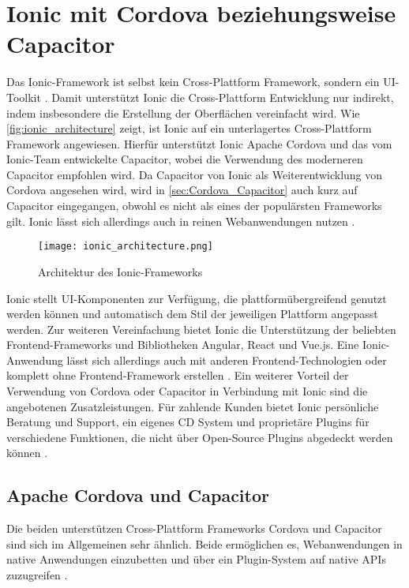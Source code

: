 \section{Ionic mit Cordova beziehungsweise Capacitor}
\label{sec:Frameworks_Ionic}

Das Ionic-Framework ist selbst kein Cross-Plattform Framework, sondern ein UI-Toolkit  \cite{Ionic_Docs}.
Damit unterstützt Ionic die Cross-Plattform Entwicklung nur indirekt, indem insbesondere die Erstellung der Oberflächen vereinfacht wird.
Wie \autoref{fig:ionic_architecture} zeigt, ist Ionic auf ein unterlagertes Cross-Plattform Framework angewiesen.
Hierfür unterstützt Ionic Apache Cordova und das vom Ionic-Team entwickelte Capacitor, wobei die Verwendung des moderneren Capacitor empfohlen wird.
Da Capacitor von Ionic als Weiterentwicklung von Cordova angesehen wird, wird in \autoref{sec:Cordova_Capacitor} auch kurz auf Capacitor eingegangen, obwohl es nicht als eines der populärsten Frameworks gilt.
Ionic lässt sich allerdings auch in reinen Webanwendungen nutzen \cite{Ionic_Docs}.
\begin{figure}[h]
    \centering
    \texttt{[image: ionic\_architecture.png]}
    \caption{Architektur des Ionic-Frameworks \cite{Ionic_Architektur}}
    \label{fig:ionic_architecture}
\end{figure}
Ionic stellt \ac{UI}-Komponenten zur Verfügung, die plattformübergreifend genutzt werden können und automatisch dem Stil der jeweiligen Plattform angepasst werden.
Zur weiteren Vereinfachung bietet Ionic die Unterstützung der beliebten Frontend-Frameworks und Bibliotheken Angular, React und Vue.js.
Eine Ionic-Anwendung lässt sich allerdings auch mit anderen Frontend-Technologien oder komplett ohne Frontend-Framework erstellen \cite{Ionic_Docs, Ionic_EvaluationGuide}.
Ein weiterer Vorteil der Verwendung von Cordova oder Capacitor in Verbindung mit Ionic sind die angebotenen Zusatzleistungen.
Für zahlende Kunden bietet Ionic persönliche Beratung und Support, ein eigenes \ac{CD} System und proprietäre Plugins für verschiedene Funktionen, die nicht über Open-Source Plugins abgedeckt werden können \cite{Ionic_EvaluationGuide}.


\subsection{Apache Cordova und Capacitor}
\label{sec:Cordova_Capacitor}
Die beiden unterstützen Cross-Plattform Frameworks Cordova und Capacitor sind sich im Allgemeinen sehr ähnlich.
Beide ermöglichen es, Webanwendungen in native Anwendungen einzubetten und über ein Plugin-System auf native \acp{API} zuzugreifen \cite{Ionic_Cordova_vs_Capacitor}.


